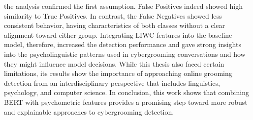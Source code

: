 the analysis confirmed the first assumption. False Positives indeed showed high similarity to True Positives. In contrast, the False Negatives showed less consistent behavior, having characteristics of both classes without a clear alignment toward either group. Integrating LIWC features into the baseline model, therefore, increased the detection performance and gave strong insights into the psycholinguistic patterns used in cybergrooming conversations and how they might influence model decisions. While this thesis also faced certain limitations, its results show the importance of approaching online grooming detection from an interdisciplinary perspective that includes linguistics, psychology, and computer science. In conclusion, this work shows that combining BERT with psychometric features provides a promising step toward more robust and explainable approaches to cybergrooming detection.